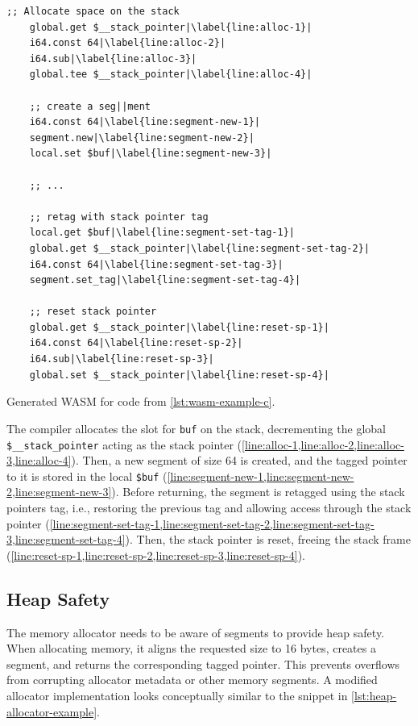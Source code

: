 \begin{lstfloat}
    \begin{lstlisting}[frame=h,style=customwasm,
        label={lst:wasm-example-inner},escapechar=|]
    ;; Allocate space on the stack
    global.get $__stack_pointer|\label{line:alloc-1}|
    i64.const 64|\label{line:alloc-2}|
    i64.sub|\label{line:alloc-3}|
    global.tee $__stack_pointer|\label{line:alloc-4}|

    ;; create a seg||ment
    i64.const 64|\label{line:segment-new-1}|
    segment.new|\label{line:segment-new-2}|
    local.set $buf|\label{line:segment-new-3}|

    ;; ...

    ;; retag with stack pointer tag
    local.get $buf|\label{line:segment-set-tag-1}|
    global.get $__stack_pointer|\label{line:segment-set-tag-2}|
    i64.const 64|\label{line:segment-set-tag-3}|
    segment.set_tag|\label{line:segment-set-tag-4}|

    ;; reset stack pointer
    global.get $__stack_pointer|\label{line:reset-sp-1}|
    i64.const 64|\label{line:reset-sp-2}|
    i64.sub|\label{line:reset-sp-3}|
    global.set $__stack_pointer|\label{line:reset-sp-4}|
    \end{lstlisting}
    \caption{Generated \ac{WASM} for code from \cref{lst:wasm-example-c}.}
    \label{lst:wasm-example}
\end{lstfloat}

The compiler allocates the slot for \texttt{buf} on the stack, decrementing the global \texttt{\$\_\_stack\_pointer} acting as the stack pointer (\cref{line:alloc-1,line:alloc-2,line:alloc-3,line:alloc-4}).
Then, a new segment of size 64 is created, and the tagged pointer to it is stored in the local \lstinline[style=customwasm]{$buf} (\cref{line:segment-new-1,line:segment-new-2,line:segment-new-3}).
Before returning, the segment is retagged using the stack pointers tag, i.e., restoring the previous tag and allowing access through the stack pointer (\cref{line:segment-set-tag-1,line:segment-set-tag-2,line:segment-set-tag-3,line:segment-set-tag-4}).
Then, the stack pointer is reset, freeing the stack frame (\cref{line:reset-sp-1,line:reset-sp-2,line:reset-sp-3,line:reset-sp-4}).

\subsection{Heap Safety}
\label{subsec:heap-safety}

The memory allocator needs to be aware of segments to provide heap safety.
When allocating memory, it aligns the requested size to 16 bytes, creates a segment, and returns the corresponding tagged pointer.
This prevents overflows from corrupting allocator metadata or other memory segments.
A modified allocator implementation looks conceptually similar to the snippet in \cref{lst:heap-allocator-example}.

